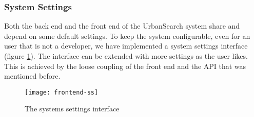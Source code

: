 \subsubsection{System Settings}

Both the back end and the front end of the UrbanSearch system share and depend on some default settings. To keep the system configurable, even for an user that is not a developer, we have implemented a system settings interface (figure \ref{fig:frontend-ss}). The interface can be extended with more settings as the user likes. This is achieved by the loose coupling of the front end and the API that was mentioned before.


\begin{figure}[H]
\centering
\texttt{[image: frontend-ss]}
\caption{The systems settings interface}
\label{fig:frontend-ss}
\end{figure}
